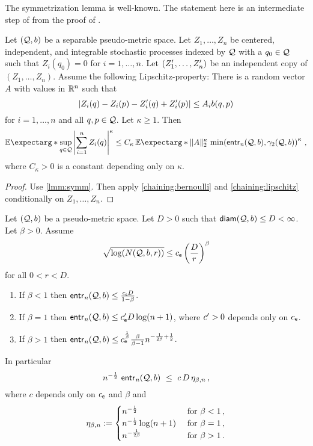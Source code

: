 %
The symmetrization lemma is well-known. The statement here is an intermediate step of from the proof of \cite[2.3.6 Lemma]{vaart96}.
%
\begin{theorem}\label{chaining:empproc}
	Let $(\mathcal{Q}, b)$ be a separable pseudo-metric space. Let $Z_1, \dots, Z_n$ be centered, independent, and integrable stochastic processes indexed by $\mathcal{Q}$ with a $q_0 \in \mathcal{Q}$ such that $Z_i(q_0) = 0$ for $i=1,\dots, n$.
	Let $(Z_1^\prime, \dots, Z_n^\prime)$ be an independent copy of $(Z_1, \dots, Z_n)$.
	Assume the following Lipschitz-property: There is a random vector $A$ with values in $\mathbb{R}^n$ such that
	\begin{equation*}
		\left| Z_i(q)-Z_i(p)-Z_i^\prime(q)+ Z_i^\prime(p) \right| \leq A_i b(q,p)
	\end{equation*} 
	for $i = 1,\dots, n$ and all $q,p\in\mathcal{Q}$.
	Let $\kappa \geq 1$.
	Then
	\begin{equation*}
		\Ex*{\sup_{q\in\mc Q} \abs{\sum_{i=1}^nZ_i(q)}^\kappa} \leq C_\kappa\, \Ex*{\normof{A}_2^\kappa} \, 
		\min\brOf{\entrn(\mc Q, b), \gamma_2(\mc Q, b)}^\kappa
		\eqcm
	\end{equation*}
	where $C_\kappa > 0$ is a constant depending only on $\kappa$.
\end{theorem}
%
\begin{proof}
	Use \autoref{lmm:symm}. Then apply \autoref{chaining:bernoulli} and \autoref{chaining:lipschitz} conditionally on $Z_1, \dots, Z_n$.
\end{proof}
%
\begin{lemma}\label{lmm:chaining:rate}
Let $(\mathcal{Q}, b)$ be a pseudo-metric space.
Let $D >0 $ such that $\operatorname{\mathsf{diam}}(\mathcal{Q}, b) \leq D < \infty$.
Let $\beta > 0$. Assume 
\begin{equation*}
	\sqrt{\log(N(\mathcal{Q}, b , r))} \leq c_{\mathsf{e}} \left( \frac{D}{r} \right)^\beta
\end{equation*}
for all $0 < r < D$.
\begin{enumerate}[label=\environmentEnumerateLabel]
	\item If $\beta < 1$ then $\operatorname{\mathsf{entr}_\mathit{n}}(\mathcal{Q}, b) \leq \frac{c_{\mathsf{e}}D}{1-\beta}$.
	\item If $\beta = 1$ then $\operatorname{\mathsf{entr}_\mathit{n}}(\mathcal{Q}, b) \leq c_{\mathsf{e}}^\prime D \log(n+1)$, where $c^\prime>0$ depends only on $c_{\mathsf{e}}$.
	\item If $\beta > 1$ then $\operatorname{\mathsf{entr}_\mathit{n}}(\mathcal{Q}, b) \leq c_{\mathsf{e}}^{\frac1\beta} \frac\beta{\beta-1} n^{-\frac1{2\beta}+\frac12}$.
\end{enumerate}
In particular
\begin{equation*}
	n^{-\frac12} \,\operatorname{\mathsf{entr}_\mathit{n}}(\mathcal{Q}, b) \ \leq\  c \, D\, \eta_{\beta,n} \, ,
\end{equation*}
where $c$ depends only on $c_{\mathsf{e}}$ and $\beta$ and
\begin{equation*}
	\eta_{\beta,n} := 
	\begin{cases} 
		n^{-\frac12} & \text{ for }\beta < 1\, ,\\
		n^{-\frac12} \log(n+1) & \text{ for } \beta = 1\, ,\\
		n^{-\frac1{2\beta}} & \text{ for } \beta > 1\, .
	\end{cases} 
\end{equation*}
\end{lemma}

